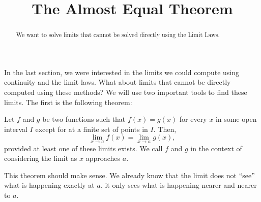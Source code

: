 \documentclass{ximera}
\title[Dig-In:]{The Almost Equal Theorem}
\begin{document}
\begin{abstract}
  We want to solve limits that cannot be solved directly using the
  Limit Laws.
\end{abstract}

\maketitle


In the last section, we were interested in the limits we could compute
using continuity and the limit laws. What about limits that cannot be
directly computed using these methods?  We will use two important
tools to find these limits.  The first is the following theorem:

\begin{theorem}
Let $f$ and $g$ be two functions such that $f(x)=g(x)$ for every $x$
in some open interval $I$ except for at a finite set of points in $I$.
Then,
\[
\lim_{x\to a} f(x)= \lim_{x\to a} g(x),
\]
provided at least one of these limits exists.  We call $f$ and $g$
 in the context of considering the limit
as $x$ approaches $a$.
\end{theorem}

This theorem should make sense. We already know that the limit does
not ``see'' what is happening exactly at $a$, it only sees what is
happening nearer and nearer to $a$. 
\end{document}
